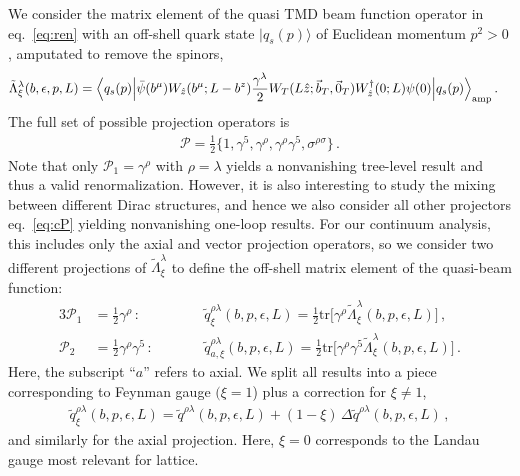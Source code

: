 \documentclass[11pt,a4paper]{article}
\DeclareRobustCommand{\eq}[1]{eq.~\eqref{eq:#1}}
\newcommand{\eps}{\epsilon}
\newcommand{\cP}{\mathcal{P}}
\newcommand{\nn}{\nonumber}
\newcommand{\tr}{\mathrm{tr}}
\newcommand{\bt}{\vec b_T}
\begin{document}
We consider the matrix element of the quasi TMD beam function operator in \eq{ren}
with an off-shell quark state $|q_s(p)\rangle$ of Euclidean momentum $p^2 > 0$,
amputated to remove the spinors,
\begin{align} \label{eq:qbeam_2}
 \tilde \Lambda^\lambda_\xi(b, \eps, p, L) = \Bigl< q_s(p) \Big| &\bar \psi(b^\mu) W_{\hat z}(b^\mu;L-b^z) \frac{\gamma^\lambda}{2}
 W_T(L \hat z; \bt, \vec{0}_T) W^\dagger_{\hat z}(0;L) \psi(0) \Big| q_s(p) \Bigr>_{\rm amp}
\,.\end{align}
The full set of possible projection operators is 
\begin{align} \label{eq:cP}
  \cP = \frac12 \Big\{ 1,{\gamma^5},  \gamma^\rho, \gamma^\rho\gamma^5,
    \sigma^{\rho\sigma} \Big\} \,.
\end{align}
Note that only $\cP_1 = \gamma^\rho$ with $\rho=\lambda$ yields a nonvanishing tree-level result and thus a valid renormalization. However, it is also interesting to study the mixing between different Dirac structures, and hence we also consider all other projectors \eq{cP} yielding nonvanishing one-loop results.
For our continuum analysis, this includes only the axial and vector projection operators,
so we consider two different projections of $\tilde \Lambda^\lambda_\xi$ to define the off-shell matrix element of the quasi-beam function:
\begin{alignat}{3} \label{eq:trace}
 \cP_1&=\frac12 \gamma^\rho\,:\qquad &&
 \tilde q^{\rho\lambda}_\xi(b,p,\eps,L) = \frac12 \tr\bigl[ \gamma^\rho \tilde \Lambda^\lambda_\xi(b,p,\eps,L) \bigr]
\,,\nn\\
 \cP_2&=\frac12 \gamma^\rho \gamma^5 \,:\qquad &&
 \tilde q^{\rho\lambda}_{a,\xi}(b,p,\eps,L) = \frac12 \tr\bigl[ \gamma^\rho \gamma^5 \tilde \Lambda^\lambda_\xi(b,p,\eps,L) \bigr]
\,.\end{alignat}
Here, the subscript ``$a$'' refers to axial.
%
We split all results into a piece corresponding to Feynman gauge $(\xi = 1$) plus a correction for $\xi\ne1$,
\begin{align}
 \tilde q^{\rho\lambda}_\xi(b,p,\eps,L) = \tilde q^{\rho\lambda}(b,p,\eps,L) + (1-\xi) \, \Delta \tilde q^{\rho\lambda}(b,p,\eps,L)
\,,\end{align}
and similarly for the axial projection.
Here, $\xi=0$ corresponds to the Landau gauge most relevant for lattice.
\end{document}

